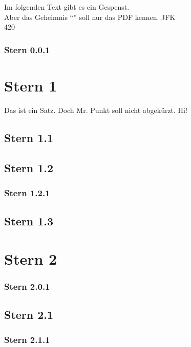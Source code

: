 \documentclass{article}
\title{\mytitle}
\newcommand{\mytitle}{How To Zotero: Gardner/Springfeld-CSL}
\newif\ifhtml
\newcommand{\htmlonly}[1]{\ifhtml#1\else\fi}
\newif\ifpdf
\newcommand{\pdfonly}[1]{\ifpdf#1\else\fi}
\begin{document}
\pdfonly{
\begin{center}
{\LARGE\textbf\mytitle}
\end{center}
}
Im folgenden Text gibt es ein \htmlonly{verstecktes} Gespenst.
\\
Aber das Geheimnis ``\pdfonly{hihihi}'' soll nur das PDF kennen. JFK
\\
420\htmlonly{69}
\pdfonly{pdfonly}
\pagestyle{fancy}
\subsubsection{Stern 0.0.1}
\section{Stern 1}
Das ist ein Satz. Doch Mr. Punkt soll nicht abgek\"urzt. Hi!
\subsection{Stern 1.1}
\subsection{Stern 1.2}
\subsubsection{Stern 1.2.1}
\subsection{Stern 1.3}
\section{Stern 2}
\subsubsection{Stern 2.0.1}
\subsection{Stern 2.1}
\subsubsection{Stern 2.1.1}
\end{document}
